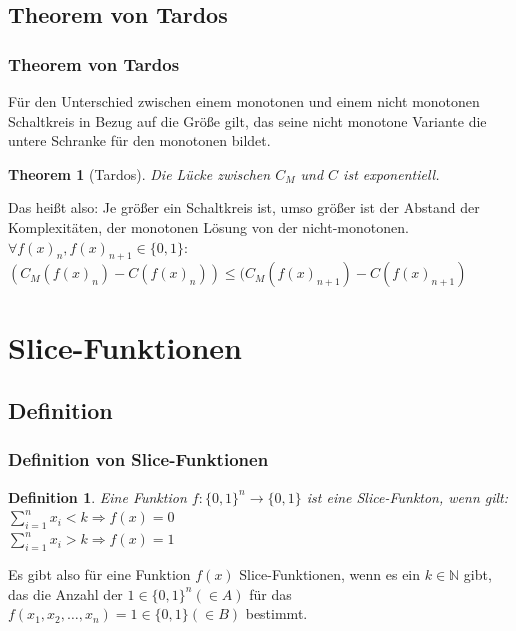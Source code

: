 \documentclass[hyperref={pdfpagelabels=false}]{beamer} %
\newtheorem{thm}{Theorem}
\newtheorem{defin}{Definition}
\begin{document}
\subsection{Theorem von Tardos}
\begin{frame}
 \frametitle{Theorem von Tardos}
Für den Unterschied zwischen einem monotonen und einem nicht monotonen Schaltkreis in Bezug auf die Größe gilt, das seine nicht monotone Variante die untere Schranke für den monotonen bildet.
\begin{thm}[Tardos]
Die Lücke zwischen $C_{M}$ und $C$ ist exponentiell.
\end{thm}
Das heißt also: Je größer ein Schaltkreis ist, umso größer ist der Abstand der Komplexitäten, der monotonen Lösung von der nicht-monotonen.\\
$\forall f(x)_n, f(x)_{n+1} \in \{0,1\}:$\\$(C_M(f(x)_n) - C(f(x)_n)) \leq (C_M(f(x)_{n+1}) - C(f(x)_{n+1})$
\end{frame}

\section{Slice-Funktionen}
\subsection*{Definition}
\begin{frame}%
 \frametitle{Definition von Slice-Funktionen}
\begin{defin}
Eine Funktion $f:\{0,1\}^n \rightarrow \{0,1\}$ ist eine Slice-Funkton, wenn gilt:\\

$\sum_{i=1}^{n} x_i<k\Rightarrow f(x)=0$\\

$\sum_{i=1}^{n} x_i>k\Rightarrow f(x)=1$\\
\end{defin}
Es gibt also für eine Funktion $f(x)$ Slice-Funktionen, wenn es ein $k \in \mathbb{N}$ gibt, das die Anzahl der $1 \in\{0,1\}^n (\in A)$ für das $f(x_1, x_2, \dots, x_n) = 1 \in \{0,1\} (\in B)$ bestimmt.\\
\end{frame}
\end{document}
